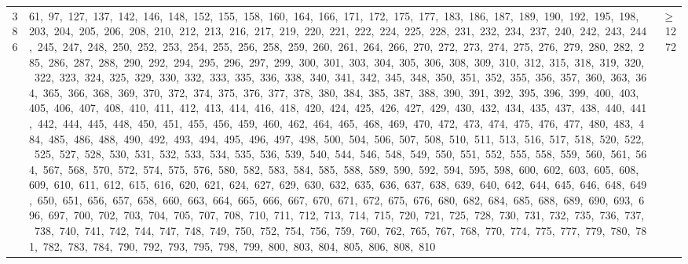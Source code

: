 \begin{longtable}{c|p{}|r}
386 & 61,\ 97,\ 127,\ 137,\ 142,\ 146,\ 148,\ 152,\ 155,\ 158,\ 160,\ 164,\ 166,\ 171,\ 172,\ 175,\ 177,\ 183,\ 186,\ 187,\ 189,\ 190,\ 192,\ 195,\ 198,\ 203,\ 204,\ 205,\ 206,\ 208,\ 210,\ 212,\ 213,\ 216,\ 217,\ 219,\ 220,\ 221,\ 222,\ 224,\ 225,\ 228,\ 231,\ 232,\ 234,\ 237,\ 240,\ 242,\ 243,\ 244,\ 245,\ 247,\ 248,\ 250,\ 252,\ 253,\ 254,\ 255,\ 256,\ 258,\ 259,\ 260,\ 261,\ 264,\ 266,\ 270,\ 272,\ 273,\ 274,\ 275,\ 276,\ 279,\ 280,\ 282,\ 285,\ 286,\ 287,\ 288,\ 290,\ 292,\ 294,\ 295,\ 296,\ 297,\ 299,\ 300,\ 301,\ 303,\ 304,\ 305,\ 306,\ 308,\ 309,\ 310,\ 312,\ 315,\ 318,\ 319,\ 320,\ 322,\ 323,\ 324,\ 325,\ 329,\ 330,\ 332,\ 333,\ 335,\ 336,\ 338,\ 340,\ 341,\ 342,\ 345,\ 348,\ 350,\ 351,\ 352,\ 355,\ 356,\ 357,\ 360,\ 363,\ 364,\ 365,\ 366,\ 368,\ 369,\ 370,\ 372,\ 374,\ 375,\ 376,\ 377,\ 378,\ 380,\ 384,\ 385,\ 387,\ 388,\ 390,\ 391,\ 392,\ 395,\ 396,\ 399,\ 400,\ 403,\ 405,\ 406,\ 407,\ 408,\ 410,\ 411,\ 412,\ 413,\ 414,\ 416,\ 418,\ 420,\ 424,\ 425,\ 426,\ 427,\ 429,\ 430,\ 432,\ 434,\ 435,\ 437,\ 438,\ 440,\ 441,\ 442,\ 444,\ 445,\ 448,\ 450,\ 451,\ 455,\ 456,\ 459,\ 460,\ 462,\ 464,\ 465,\ 468,\ 469,\ 470,\ 472,\ 473,\ 474,\ 475,\ 476,\ 477,\ 480,\ 483,\ 484,\ 485,\ 486,\ 488,\ 490,\ 492,\ 493,\ 494,\ 495,\ 496,\ 497,\ 498,\ 500,\ 504,\ 506,\ 507,\ 508,\ 510,\ 511,\ 513,\ 516,\ 517,\ 518,\ 520,\ 522,\ 525,\ 527,\ 528,\ 530,\ 531,\ 532,\ 533,\ 534,\ 535,\ 536,\ 539,\ 540,\ 544,\ 546,\ 548,\ 549,\ 550,\ 551,\ 552,\ 555,\ 558,\ 559,\ 560,\ 561,\ 564,\ 567,\ 568,\ 570,\ 572,\ 574,\ 575,\ 576,\ 580,\ 582,\ 583,\ 584,\ 585,\ 588,\ 589,\ 590,\ 592,\ 594,\ 595,\ 598,\ 600,\ 602,\ 603,\ 605,\ 608,\ 609,\ 610,\ 611,\ 612,\ 615,\ 616,\ 620,\ 621,\ 624,\ 627,\ 629,\ 630,\ 632,\ 635,\ 636,\ 637,\ 638,\ 639,\ 640,\ 642,\ 644,\ 645,\ 646,\ 648,\ 649,\ 650,\ 651,\ 656,\ 657,\ 658,\ 660,\ 663,\ 664,\ 665,\ 666,\ 667,\ 670,\ 671,\ 672,\ 675,\ 676,\ 680,\ 682,\ 684,\ 685,\ 688,\ 689,\ 690,\ 693,\ 696,\ 697,\ 700,\ 702,\ 703,\ 704,\ 705,\ 707,\ 708,\ 710,\ 711,\ 712,\ 713,\ 714,\ 715,\ 720,\ 721,\ 725,\ 728,\ 730,\ 731,\ 732,\ 735,\ 736,\ 737,\ 738,\ 740,\ 741,\ 742,\ 744,\ 747,\ 748,\ 749,\ 750,\ 752,\ 754,\ 756,\ 759,\ 760,\ 762,\ 765,\ 767,\ 768,\ 770,\ 774,\ 775,\ 777,\ 779,\ 780,\ 781,\ 782,\ 783,\ 784,\ 790,\ 792,\ 793,\ 795,\ 798,\ 799,\ 800,\ 803,\ 804,\ 805,\ 806,\ 808,\ 810 & $\ge$ 1272 \\

\end{longtable}
